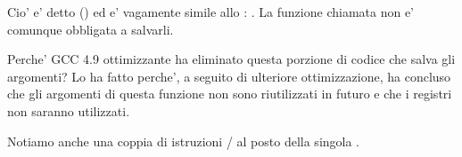 Cio' e' detto  (\ARMPCS) ed e' vagamente simile allo : .
La funzione chiamata non e' comunque obbligata a salvarli.

Perche' GCC 4.9 ottimizzante ha eliminato questa porzione di codice che salva gli argomenti?
Lo ha fatto perche', a seguito di ulteriore ottimizzazione, ha concluso che gli argomenti di questa funzione non sono riutilizzati in futuro e
che i registri  non saranno utilizzati.


Notiamo anche una coppia di istruzioni / al posto della singola .

